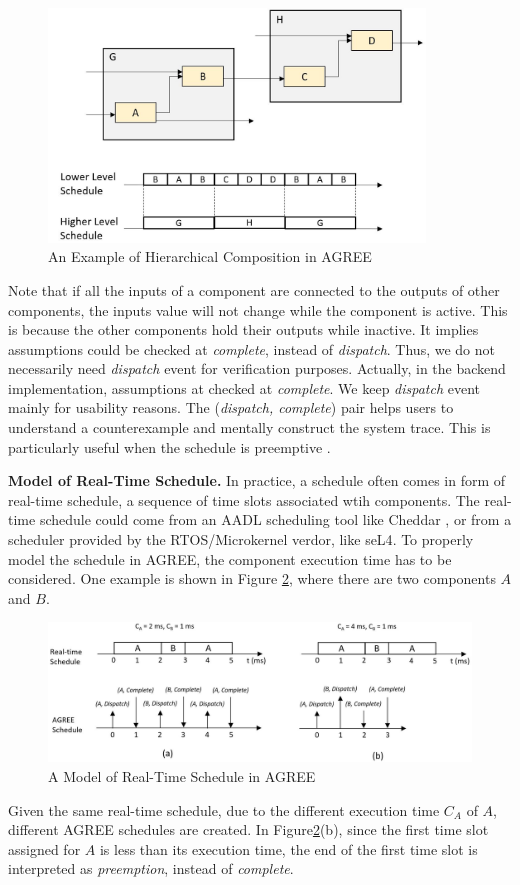 \begin{figure}[ht!]
\centering
\includegraphics[width=100mm]{Hierarchy.jpg}
\caption{An Example of Hierarchical Composition in AGREE\label{pic:hierarchy}}
\end{figure}

Note that if all the inputs of a component are connected to the outputs of other components, the inputs value will not change while the component is active. This is because the other components hold their outputs while inactive. It implies assumptions could be checked at \emph{complete}, instead of \emph{dispatch}. Thus, we do not necessarily need \emph{dispatch} event for verification purposes. Actually, in the backend implementation, assumptions at checked at \emph{complete}. We keep \emph{dispatch} event mainly for usability reasons. The (\emph{dispatch, complete}) pair helps users to understand a counterexample and mentally construct the system trace. This is particularly useful when the schedule is preemptive .

{\bf Model of Real-Time Schedule.}
In practice, a schedule often comes in form of real-time schedule, a sequence of time slots associated wtih components. The real-time schedule could come from an AADL scheduling tool like Cheddar \cite{Cheddar}, or from a scheduler provided by the RTOS/Microkernel verdor, like seL4\cite{seL4}. To properly model the schedule in AGREE, the component execution time has to be considered. One example is shown in Figure \ref{RTschedule}, where there are two components $A$ and $B$. 
\begin{figure}[ht!]
\centering
\includegraphics[width=130mm]{RTschedule.jpg}
\caption{A Model of Real-Time Schedule in AGREE\label{RTschedule}}
\end{figure}
Given the same real-time schedule, due to the different execution time $C_A$ of $A$, different AGREE schedules are created. In Figure\ref{RTschedule}(b), since the first time slot assigned for $A$ is less than its execution time, the end of the first time slot is interpreted as \emph{preemption}, instead of \emph{complete}.


